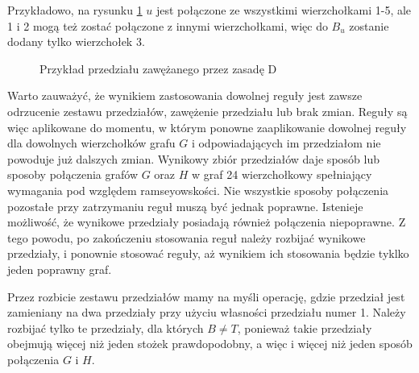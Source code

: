 Przykładowo, na rysunku \ref{zasadaD2} $u$ jest połączone ze wszystkimi wierzchołkami 1-5, ale 1 i 2 mogą też zostać połączone z innymi wierzchołkami, więc do
$B_u$ zostanie dodany tylko wierzchołek 3.   
\begin{figure}[H]
  \centering
 \caption{Przykład przedziału zawężanego przez zasadę D}
 \label{zasadaD2}
 \end{figure}

Warto zauważyć, że wynikiem zastosowania dowolnej reguły jest zawsze odrzucenie zestawu przedziałów, zawężenie przedziału lub brak zmian. Reguły są więc aplikowane do momentu, w którym ponowne zaaplikowanie dowolnej reguły dla dowolnych wierzchołków grafu $G$ i odpowiadających im przedziałom nie powoduje już dalszych zmian. Wynikowy zbiór przedziałów daje sposób lub sposoby połączenia grafów $G$ oraz $H$ w graf 24 wierzchołkowy spełniający wymagania pod względem ramseyowskości. Nie wszystkie sposoby połączenia pozostałe przy zatrzymaniu reguł muszą być jednak poprawne. Istenieje możliwość, że wynikowe przedziały posiadają również połączenia niepoprawne. Z tego powodu, po zakończeniu stosowania reguł należy rozbijać wynikowe przedziały, i ponownie stosować reguły, aż wynikiem ich stosowania będzie tyklko jeden poprawny graf.

Przez rozbicie zestawu przedziałów mamy na myśli operację, gdzie przedział jest zamieniany na dwa przedziały przy użyciu własności przedziału numer 1. Należy rozbijać tylko te przedziały, dla których $B \neq T$, ponieważ takie przedziały obejmują więcej niż jeden stożek prawdopodobny, a więc i więcej niż jeden sposób połączenia $G$ i $H$.

